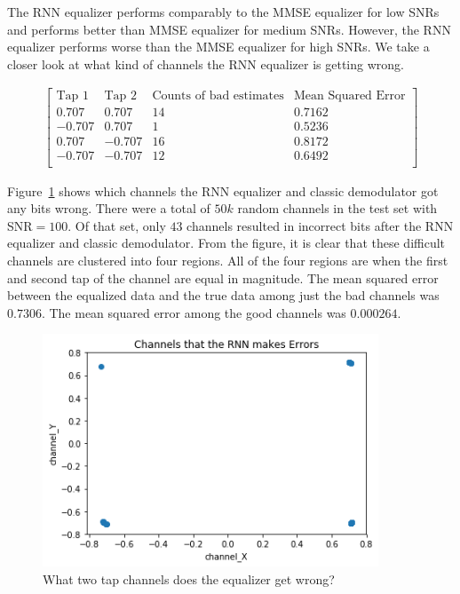 The RNN equalizer performs comparably to the MMSE equalizer for low SNRs and performs better than MMSE equalizer for medium SNRs.  However, the RNN equalizer performs worse than the MMSE equalizer for high SNRs.  We take a closer look at what kind of channels the RNN equalizer is getting wrong.

\begin{align*}
\begin{bmatrix}
\text{Tap 1} & \text{Tap 2} & \text{Counts of bad estimates} & \text{Mean Squared Error}\\
\hline
0.707 & 0.707 & 14 & 0.7162\\
-0.707 & 0.707 & 1 & 0.5236\\
0.707 & -0.707 & 16 & 0.8172\\
-0.707 & -0.707 & 12 & 0.6492\\
\end{bmatrix}
\end{align*}

Figure~\ref{fig:incorr_chan} shows which channels the RNN equalizer and classic demodulator got any bits wrong.  
There were a total of $50k$ random channels in the test set with SNR$=100$.
Of that set, only $43$ channels resulted in incorrect bits after the RNN equalizer and classic demodulator.
From the figure, it is clear that these difficult channels are clustered into four regions. All of the four regions are when the first and second tap of the channel are equal in magnitude.
The mean squared error between the equalized data and the true data among just the bad channels was $0.7306$.  The mean squared error among the good channels was $0.000264$.

\begin{figure}
\begin{center}
\includegraphics[width=100mm]{figures/equal/incorrect_channels.png}
\caption{What two tap channels does the equalizer get wrong?}
\label{fig:incorr_chan}
\end{center}
\end{figure}

